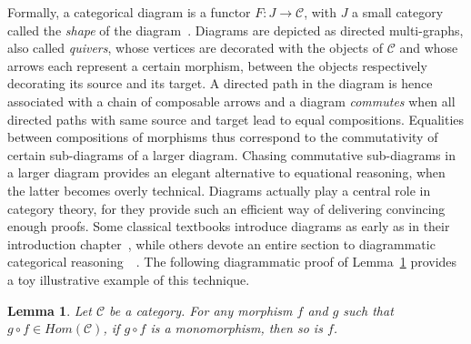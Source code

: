 \documentclass[10pt,a4paper]{article}
\newtheorem{lemma}[theorem]{Lemma}
\renewcommand{\~}{\widetilde}
\newcommand{\Cat}{\mathcal C}
\begin{document}
Formally, a categorical diagram is a functor $F\colon J \rightarrow \mathcal{C}$, with $J$ a small category called the \emph{shape} of the diagram~\cite{zbMATH01324388}. Diagrams are depicted as directed multi-graphs, also called \emph{quivers}, whose vertices are decorated with the objects of $\mathcal{C}$ and whose arrows each represent a certain morphism, between the objects respectively decorating its source and its target. A directed path in the diagram is hence associated with a chain of composable arrows and a diagram \emph{commutes} when all directed paths with same source and target lead to equal compositions. Equalities between compositions of morphisms thus correspond to the commutativity of certain sub-diagrams of a larger diagram. Chasing commutative sub-diagrams in a larger diagram provides an elegant alternative to equational reasoning, when the latter becomes overly technical. Diagrams actually play a central role in category theory, for they provide such an efficient way of delivering convincing enough proofs. Some classical textbooks introduce diagrams as early as in their introduction chapter~\cite{zbMATH01216133}, while others devote an entire section to diagrammatic categorical reasoning~\cite[Section 1.6]{riehl}~\cite[Session 17]{zbMATH05593534}. The following diagrammatic proof of Lemma~\ref{lem:monomonom} provides a toy illustrative example of this technique.

\begin{lemma}\label{lem:monomonom}
  Let $\Cat$ be a category. For any morphism $f$ and $g$ such that $g \circ f \in Hom(\Cat)$, if $g \circ f$ is a monomorphism, then so is $f$.
\end{lemma}
\end{document}
